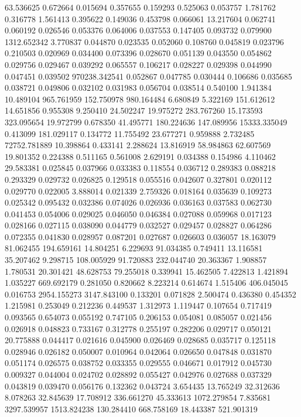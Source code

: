 63.536625
0.672664
0.015694
0.357655
0.159293
0.525063
0.053757
1.781762
0.316778
1.561413
0.395622
0.149036
0.453798
0.066061
13.217604
0.062741
0.060192
0.026546
0.053376
0.064006
0.037553
0.147405
0.093732
0.079900
1312.652342
3.770837
0.044870
0.023535
0.052060
0.108760
0.045819
0.023796
0.210503
0.020969
0.034400
0.073396
0.028670
0.051139
0.043550
0.054862
0.029756
0.029467
0.039292
0.065557
0.106217
0.028227
0.029398
0.044990
0.047451
0.039502
970238.342541
0.052867
0.047785
0.030444
0.106686
0.035685
0.038721
0.049806
0.032102
0.031983
0.056704
0.038514
0.540100
1.941384
10.489104
965.761959
152.750978
980.164484
6.680849
5.322169
151.612612
14.651856
0.955308
9.250410
24.502247
19.975272
283.767260
15.173593
323.095654
19.972799
0.678350
41.495771
180.224636
147.089956
15333.335049
0.413099
181.029117
0.134772
11.755492
23.677271
0.959888
2.732485
72752.781889
10.398864
0.433141
2.288624
13.816919
58.984863
62.607569
19.801352
0.224388
0.511165
0.561008
2.629191
0.034388
0.154986
4.110462
29.583381
0.025845
0.037966
0.033383
0.118554
0.036712
0.289383
0.088218
0.293329
0.029732
0.026825
0.129518
0.055516
0.042607
0.327801
0.020112
0.029770
0.022005
3.888014
0.021339
2.759326
0.018164
0.035639
0.109273
0.025342
0.095432
0.032386
0.074026
0.026936
0.036163
0.037583
0.062730
0.041453
0.054006
0.029025
0.046050
0.046384
0.027088
0.059968
0.017123
0.028166
0.027115
0.038090
0.044779
0.032527
0.029457
0.028827
0.064286
0.072355
0.041830
0.028957
0.087201
0.027687
0.026603
0.036057
18.163079
81.062455
194.659161
14.804251
6.229693
91.034385
0.749411
13.116581
35.207462
9.298715
108.005929
91.720883
232.044740
20.363367
1.908857
1.780531
20.301421
48.628753
79.255018
0.339941
15.462505
7.422813
1.421894
1.035227
669.692179
0.281050
0.820662
8.223214
0.614674
1.515406
406.045045
0.016753
2954.155273
3147.843100
0.133201
0.071828
2.500474
0.436380
0.454352
1.215981
0.253049
0.212236
0.449537
1.312973
1.119447
0.107654
0.717419
0.093565
0.654073
0.055192
0.747105
0.206153
0.054081
0.085057
0.021456
0.026918
0.048823
0.733167
0.312778
0.255197
0.282206
0.029717
0.050121
20.775888
0.044417
0.021616
0.045900
0.026469
0.028685
0.035717
0.125118
0.028946
0.026182
0.050007
0.010964
0.042064
0.026650
0.047848
0.031870
0.051174
0.026575
0.038752
0.033355
0.029555
0.046671
0.017912
0.045730
0.009327
0.044004
0.024702
0.028892
0.055427
0.042976
0.027688
0.037329
0.043819
0.039470
0.056176
0.132362
0.043724
3.654435
13.765249
32.312636
8.078263
32.845639
17.708912
336.661270
45.333613
1072.279854
7.835681
3297.539957
1513.824238
130.284410
668.758169
18.443387
521.901319
